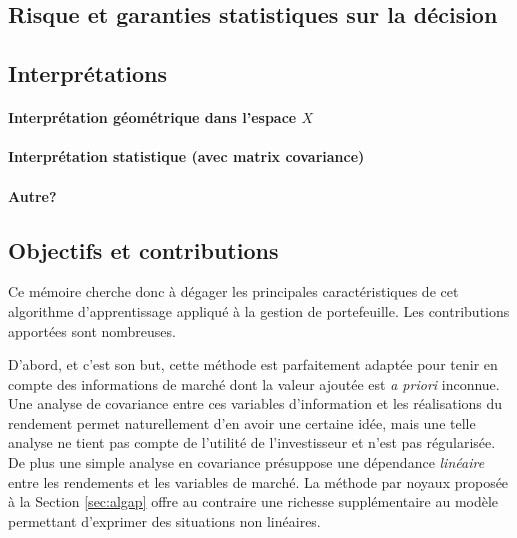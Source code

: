 \subsection{Risque et garanties statistiques sur la décision}



\subsection{Interprétations}

\paragraph{Interprétation géométrique dans l'espace $X$}

\paragraph{Interprétation statistique (avec matrix covariance)}

\par\paragraph{Autre?}



\subsection{Objectifs et contributions}

Ce mémoire cherche donc à dégager les principales caractéristiques de cet algorithme
d'apprentissage appliqué à la gestion de portefeuille. Les contributions apportées sont
nombreuses.

D'abord, et c'est son but, cette méthode est parfaitement adaptée pour tenir en compte des
informations de marché dont la valeur ajoutée est \textit{a priori} inconnue. Une analyse
de covariance entre ces variables d'information et les réalisations du rendement permet
naturellement d'en avoir une certaine idée, mais une telle analyse ne tient pas compte de
l'utilité de l'investisseur et n'est pas régularisée. De plus une simple analyse en
covariance présuppose une dépendance \textit{linéaire} entre les rendements et les
variables de marché. La méthode par noyaux proposée à la Section \ref{sec:algap} offre au
contraire une richesse supplémentaire au modèle permettant d'exprimer des situations non
linéaires.

